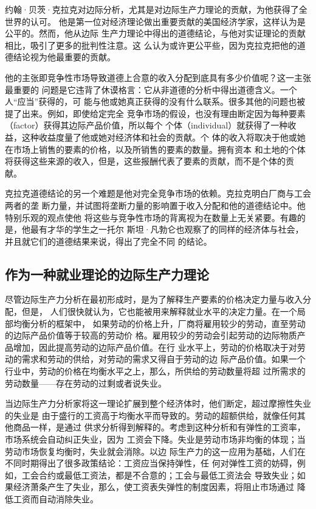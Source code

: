 约翰·贝茨·克拉克对边际分析，尤其是对边际生产力理论的贡献，为他获得了全世界的认可。
他是第一位对经济理论做出重要贡献的美国经济学家，这样认为是公平的。然而，他从边际
生产力理论中得出的道德结论，与他对实证理论的贡献相比，吸引了更多的批判性注意。这
么认为或许更公平些，因为克拉克把他的道德结论视为他最重要的贡献。

他的主张即竞争性市场导致道德上合意的收入分配到底具有多少价值呢？这一主张最重要的
问题是它违背了休谟格言：它从非道德的分析中得出道德含义。一个人“应当”获得的，可
能与他或她真正获得的没有什么联系。很多其他的问题也被提了出来。例如，即使给定完全
竞争市场的假设，也没有理由断定因为每种要素（factor）获得其边际产品价值，所以每个
个体（individual）就获得了一种收益，这种收益度量了他或她对经济体和社会的贡献。个
体的收入将取决于他或她在市场上销售的要素的价格，以及所销售的要素的数量。拥有资本
和土地的个体将获得这些来源的收入，但是，这些报酬代表了要素的贡献，而不是个体的贡
献。

克拉克道德结论的另一个难题是他对完全竞争市场的依赖。克拉克明白厂商与工会两者的垄
断力量，并试图将垄断力量的影响置于收入分配和他的道德结论中。他特别乐观的观点使他
将这些与竞争性市场的背离视为在数量上无关紧要。有趣的是，他最有才华的学生之一托尔
斯坦·凡勃仑也观察了的同样的经济体与社会，并且就它们的道德结果来说，得出了完全不同
的结论。

\subsection{作为一种就业理论的边际生产力理论}

尽管边际生产力分析在最初形成时，是为了解释生产要素的价格决定力量与收入分配，但是，
人们很快就认为，它也能被用来解释就业水平的决定力量。在一个局部均衡分析的框架中，
如果劳动的价格上升，厂商将雇用较少的劳动，直至劳动的边际产品价值等于较高的劳动价
格。雇用较少的劳动会引起劳动的边际物质产品增加，因此提高劳动的边际产品价值。在行
业水平上，劳动的价格取决于对劳动的需求和劳动的供给，对劳动的需求又得自于劳动的边
际产品价值。如果一个行业中，劳动的价格在均衡水平之上，那么，所供给的劳动数量将超
过所需求的劳动数量——存在劳动的过剩或者说失业。

当边际生产力分析家将这一理论扩展到整个经济体时，他们断定，超过摩擦性失业的失业是
由于盛行的工资高于均衡水平而导致的。劳动的超额供给，就像任何其他商品一样，是通过
供求分析得到解释的。考虑到这种分析和有弹性的工资率，市场系统会自动纠正失业，因为
工资会下降。失业是劳动市场非均衡的体现；当劳动市场恢复均衡时，失业就会消除。以边
际生产力的这一应用为基础，人们在不同时期得出了很多政策结论：工资应当保持弹性，任
何对弹性工资的妨碍，例如，工会合约或最低工资法，都是不合意的；工会与最低工资法会
导致失业；如果经济萧条产生了失业，那么，使工资表失弹性的制度因素，将阻止市场通过
降低工资而自动消除失业。

